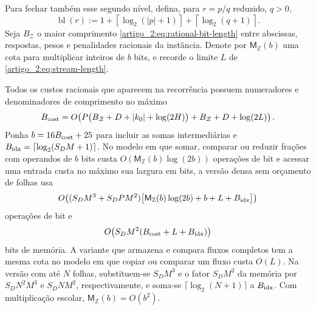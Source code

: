 Para fechar também esse segundo nível, defina, para $r=p/q$ reduzido, $q>0$,
\begin{equation}
 \operatorname{bl}(r)
 :=1+\left\lceil\log_2(|p|+1)\right\rceil
    +\left\lceil\log_2(q+1)\right\rceil .
 \label{artigo_2:eq:rational-bit-length}
\end{equation}
Seja $B_{\mathcal Z}$ o maior comprimento \eqref{artigo_2:eq:rational-bit-length}
entre abscissas, respostas, pesos e penalidades racionais da instância. Denote
por $\mathsf M_{\mathbb Z}(b)$ uma cota para multiplicar inteiros de $b$ bits,
e recorde o limite $L$ de \eqref{artigo_2:eq:stream-length}.

\begin{theorem}\label{map:artigo_2:9.3}
\label{artigo_2:thm:bit-complexity}
Todos os custos racionais que aparecem na recorrência possuem numeradores e
denominadores de comprimento no máximo
\begin{equation}
 B_{\rm cost}
 =O\!\left(
 P\bigl(B_{\mathcal Z}+D+|k_0|+\log(2H)\bigr)
 +B_{\mathcal Z}+D+\log(2L)
 \right).
 \label{artigo_2:eq:cost-bit-growth}
\end{equation}
Ponha $b=16B_{\rm cost}+25$ para incluir as somas intermediárias e
$B_{\rm idx}=\lceil\log_2(S_DM+1)\rceil$. No modelo em que
somar, comparar ou reduzir frações com operandos de $b$ bits custa
$O(\mathsf M_{\mathbb Z}(b)\log(2b))$ operações de bit e acessar uma entrada
custa no máximo sua largura em bits, a versão densa sem orçamento de folhas usa
\begin{equation}
 O\!\left(
 (S_DM^3+S_DPM^2)
 \bigl[\mathsf M_{\mathbb Z}(b)
       \log(2b)+b+L+B_{\rm idx}\bigr]
 \right)
 \label{artigo_2:eq:dense-bit-time}
\end{equation}
operações de bit e
\begin{equation}
 O\!\left(S_DM^2(B_{\rm cost}+L+B_{\rm idx})\right)
 \label{artigo_2:eq:dense-bit-memory}
\end{equation}
bits de memória. A variante que armazena e compara fluxos completos tem
a mesma cota no modelo em que copiar ou comparar um fluxo custa $O(L)$.
Na versão com até $N$ folhas, substituem-se $S_DM^3$ e o fator $S_DM^2$
da memória por $S_DN^2M^3$ e $S_DNM^2$, respectivamente, e soma-se
$\lceil\log_2(N+1)\rceil$ a $B_{\rm idx}$. Com multiplicação escolar,
$\mathsf M_{\mathbb Z}(b)=O(b^2)$.
\end{theorem}


